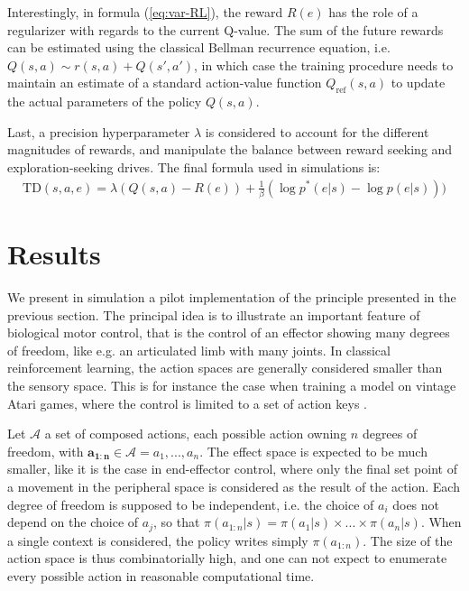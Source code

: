\documentclass[runningheads]{llncs}
\begin{document}
Interestingly, in formula (\ref{eq:var-RL}), the reward $R(e)$ has the role of a regularizer with regards to the current Q-value. The sum of the future rewards can be estimated using the classical Bellman recurrence equation, i.e. $Q(s,a) \sim r(s,a) + Q(s', a')$, in which case the training procedure needs to maintain an estimate of a standard action-value function $Q_\text{ref}(s,a)$ to update the actual parameters of the policy $Q(s,a)$.  

Last, a precision hyperparameter $\lambda$ is considered to account for the different magnitudes of rewards, and manipulate the balance between reward seeking and exploration-seeking drives. The final formula used in simulations is:
   \begin{align}\label{eq:var-RL-lambda}
   \text{TD}(s,a,e) = \lambda(Q(s,a) - R(e)) + \frac{1}{\beta} (\log p^*(e|s) - \log p(e|s)))
   \end{align}


\section{Results}

We present in simulation a pilot implementation of the principle presented in the previous section. The principal idea is to illustrate an important feature of biological motor control, that is the control of an effector showing many degrees of freedom, like e.g. an articulated limb with many joints. 
In classical reinforcement learning, the action spaces are generally considered smaller than the sensory space. This is for instance the case when training a model on vintage Atari games, where the control is limited to a set of action keys \cite{mnih2013playing}.

Let $\mathcal{A}$ a set of composed actions, each possible action owning $n$ degrees of freedom, with $\mathbf{a_{1:n}} \in \mathcal{A} = {a_1,...,a_n}$. The effect space is expected to be much smaller, like it is the case in end-effector control, where only the final set point of a movement in the peripheral space is considered as the result of the action. Each degree of freedom is supposed to be independent, i.e. the choice of $a_i$ does not depend on the choice of $a_j$, so that $\pi(a_{1:n}|s) = \pi(a_1|s) \times ... \times \pi(a_n|s)$. When a single context is considered, the policy writes simply $\pi(a_{1:n})$.
The size of the action space is thus combinatorially high, and one can not expect to enumerate every possible action in reasonable computational time. 
\end{document}

